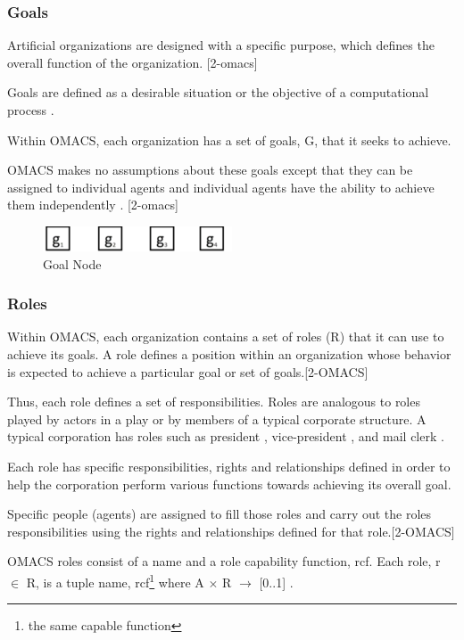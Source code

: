\subsubsection{Goals}

Artificial organizations are designed with a specific purpose, which defines the overall function
of the organization. [2-omacs]

Goals are defined as a desirable situation or the objective of a
computational process .

Within OMACS, each organization has a set of goals, G, that it seeks
to achieve.

OMACS makes no assumptions about these goals except that they can be assigned to
individual agents and individual agents have the ability to achieve them independently . [2-omacs]

\begin{figure}[th]
	\centering
		\includegraphics{chapiter1/img/Goal}
	\caption{\label{fig:Goal Node}Goal Node }
\end{figure}

\subsubsection{Roles } 

Within OMACS, each organization contains a set of roles (R) that it can use to achieve its goals.
A role defines a position within an organization whose behavior is expected to achieve a
particular goal or set of goals.[2-OMACS]

Thus, each role defines a set of responsibilities. Roles are
analogous to roles played by actors in a play or by members of a typical corporate structure. A
typical corporation has roles such as  president ,  vice-president , and  mail clerk .  

Each role has specific responsibilities, rights and relationships defined in order to help the corporation
perform various functions towards achieving its overall goal. 

Specific people (agents) are assigned to fill those roles and carry out the roles responsibilities using the rights and
relationships defined for that role.[2-OMACS]

OMACS roles consist of a name and a role capability function, rcf. Each role, r $\in$ R, is a tuple
\textlangle{} name, rcf\footnote{the same capable function} \textrangle{}  where A $\times$ R $\rightarrow$ {[}0..1{]} .


